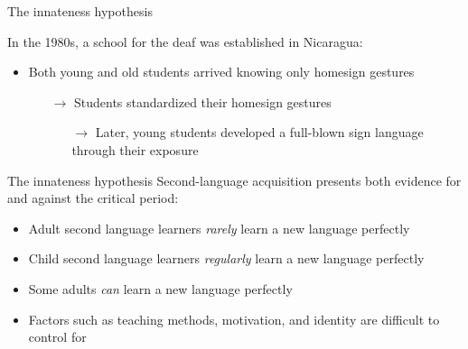 \documentclass{beamer}
\begin{document}
        \begin{frame}{The innateness hypothesis}
            \begin{example}
                In the 1980s, a school for the deaf was established in Nicaragua:
                \begin{itemize}
                    \item Both young and old students arrived knowing only homesign gestures
                    \begin{itemize}
                        \item[$\rightarrow$] Students standardized their homesign gestures
                        \begin{itemize}
                            \item[$\rightarrow$] Later, young students developed a full-blown sign language through their exposure
                        \end{itemize}
                    \end{itemize}
                \end{itemize}
            \end{example}
        \end{frame}
        \begin{frame}{The innateness hypothesis}
            Second-language acquisition presents both evidence for and against the critical period:
            \begin{itemize}
                \item<2-> Adult second language learners \emph{rarely} learn a new language perfectly
                \item<2-> Child second language learners \emph{regularly} learn a new language perfectly
                \item<3-> Some adults \emph{can} learn a new language perfectly
                \item<3-> Factors such as teaching methods, motivation, and identity are difficult to control for
            \end{itemize}
        \end{frame}
\end{document}
